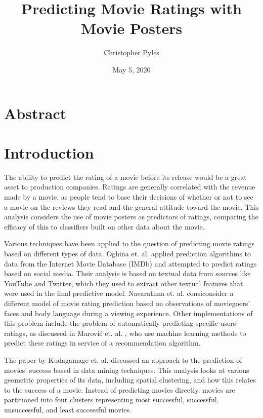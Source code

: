 \documentclass[12pt, oneside]{article}   	%
\title{%
	Predicting Movie Ratings with Movie Posters}
\author{Christopher Pyles}
\date{May 5, 2020}							%
\begin{document}
\maketitle

\section*{Abstract}

\newpage

\tableofcontents

\newpage

\section{Introduction}

The ability to predict the rating of a movie before its release would be a great asset to production companies. Ratings are generally correlated with the revenue made by a movie, as people tend to base their decisions of whether or not to see a movie on the reviews they read and the general attitude toward the movie. This analysis considers the use of movie posters as predictors of ratings, comparing the efficacy of this to classifiers built on other data about the movie.

Various techniques have been applied to the question of predicting movie ratings based on different types of data. Oghina et. al. \cite{oghina_predicting_2012} applied prediction algorithms to data from the Internet Movie Database (IMDb) and attempted to predict ratings based on social media. Their analysis is based on textual data from sources like YouTube and Twitter, which they used to extract other textual features that were used in the final predictive model. Navarathna et. al. \cite{navarathna_predicting_2014} consiconsider a different model of movie rating prediction based on observations of moviegoers' faces and body language during a viewing experience. Other implementations of this problem include the problem of automatically predicting specific users' ratings, as discussed in Marović et. al. \cite{marovic_automatic_2011}, who use machine learning methods to predict these ratings in service of a recommendation algorithm.

The paper by Kudagamage et. al. \cite{kudagamage_data_2018} discussed an approach to the prediction of movies' success based in data mining techniques. This analysis looks at various geometric properties of its data, including spatial clustering, and how this relates to the success of a movie. Instead of predicting movies directly, movies are partitioned into four clusters representing most successful, successful, unsuccessful, and least successful movies. 
\end{document}
